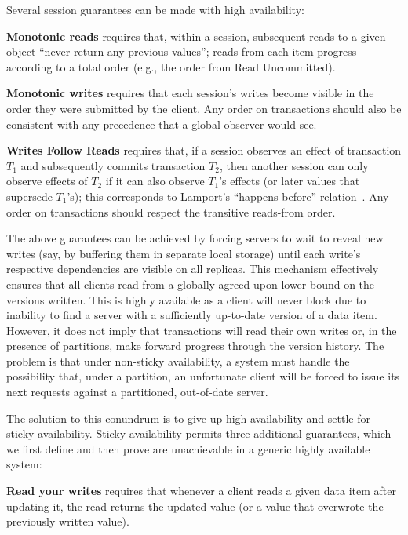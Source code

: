 Several session guarantees can be made with high availability:

\vspace{.5em}\noindent\textbf{{Monotonic reads}} requires that, within
a session, subsequent reads to a given object ``never return any
previous values''; reads from each item progress according to a total
order (e.g., the order from Read Uncommitted).

\vspace{.5em}\noindent\textbf{{Monotonic writes}} requires that each
session's writes become visible in the order they were submitted by
the client. Any order on transactions should also be consistent with
any precedence that a global observer would see.

\vspace{.5em}\noindent\textbf{{Writes Follow Reads}} requires that, if
a session observes an effect of transaction $T_1$ and subsequently
commits transaction $T_2$, then another session can only observe
effects of $T_2$ if it can also observe $T_1$'s effects (or later
values that supersede $T_1$'s); this corresponds to Lamport's
``happens-before'' relation~\cite{lamportclocks}.  Any order on
transactions should respect the transitive reads-from
order.\vspace{.5em}

The above guarantees can be achieved by forcing servers to wait to
reveal new writes (say, by buffering them in separate local storage)
until each write's respective dependencies are visible on all
replicas. This mechanism effectively ensures that all clients read
from a globally agreed upon lower bound on the versions written. This
is highly available as a client will never block due to inability to
find a server with a sufficiently up-to-date version of a data
item. However, it does not imply that transactions will read their own
writes or, in the presence of partitions, make forward progress
through the version history. The problem is that under non-sticky
availability, a system must handle the possibility that, under a
partition, an unfortunate client will be forced to issue its next
requests against a partitioned, out-of-date server.

The solution to this conundrum is to give up high availability and
settle for sticky availability. Sticky availability permits three
additional guarantees, which we first define and then prove are
unachievable in a generic highly available system:

\vspace{.5em}\noindent\textbf{{Read your writes}} requires that
whenever a client reads a given data item after updating it, the read
returns the updated value (or a value that overwrote the previously
written value).

